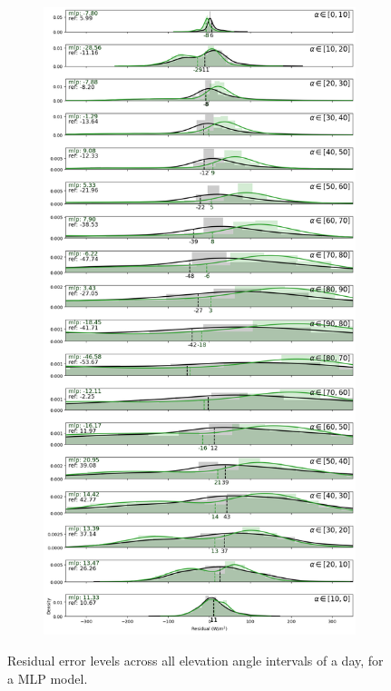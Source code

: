 \begin{figure}\ContinuedFloat
    \begin{subfigure}{\columnwidth}
        \centering
        \includegraphics[width=0.49\columnwidth]{figures/first_study/residual_errors_mlp_site4_rmse.png}
    \end{subfigure}
    \caption[]{Residual error levels across all elevation angle intervals of a day, for a MLP model.}
\end{figure}


